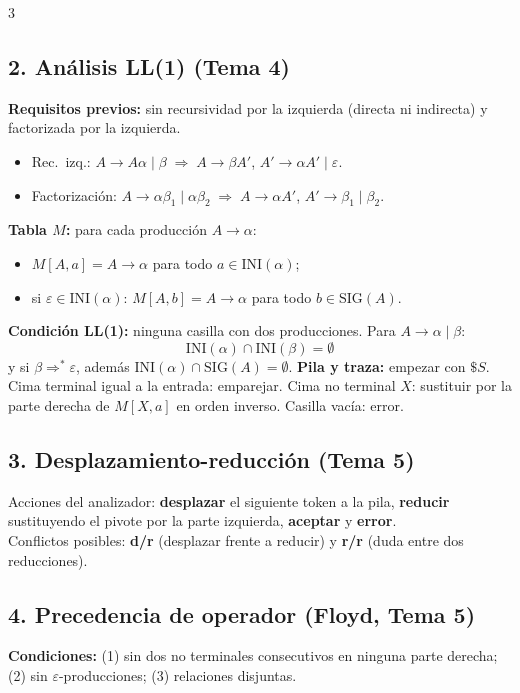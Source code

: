 \begin{landscape}
\begin{multicols*}{3}
\subsection*{2. Análisis LL(1) (Tema 4)}
\textbf{Requisitos previos:} sin recursividad por la izquierda (directa ni indirecta) y factorizada por la izquierda.
\begin{itemize}
\item Rec.\ izq.: $A\to A\alpha\mid\beta\;\Rightarrow\;A\to\beta A'$, $A'\to\alpha A'\mid\varepsilon$.
\item Factorización: $A\to\alpha\beta_1\mid\alpha\beta_2\;\Rightarrow\;A\to\alpha A'$, $A'\to\beta_1\mid\beta_2$.
\end{itemize}
\textbf{Tabla $M$:} para cada producción $A\to\alpha$:
\begin{itemize}
\item $M[A,a]=A\to\alpha$ para todo $a\in\mathrm{INI}(\alpha)$;
\item si $\varepsilon\in\mathrm{INI}(\alpha)$: $M[A,b]=A\to\alpha$ para todo $b\in\mathrm{SIG}(A)$.
\end{itemize}
\textbf{Condición LL(1):} ninguna casilla con dos producciones. Para $A\to\alpha\mid\beta$:
\[
\mathrm{INI}(\alpha)\cap\mathrm{INI}(\beta)=\emptyset
\]
y si $\beta\Rightarrow^*\varepsilon$, además $\mathrm{INI}(\alpha)\cap\mathrm{SIG}(A)=\emptyset$.
\textbf{Pila y traza:} empezar con $\$S$. Cima terminal igual a la entrada: emparejar. Cima no terminal $X$: sustituir por la parte derecha de $M[X,a]$ en orden inverso. Casilla vacía: error.

\subsection*{3. Desplazamiento-reducción (Tema 5)}
Acciones del analizador: \textbf{desplazar} el siguiente token a la pila, \textbf{reducir} sustituyendo el pivote por la parte izquierda, \textbf{aceptar} y \textbf{error}.\\
Conflictos posibles: \textbf{d/r} (desplazar frente a reducir) y \textbf{r/r} (duda entre dos reducciones).

\subsection*{4. Precedencia de operador (Floyd, Tema 5)}
\textbf{Condiciones:} (1) sin dos no terminales consecutivos en ninguna parte derecha; (2) sin $\varepsilon$-producciones; (3) relaciones disjuntas.


\end{multicols*}
\end{landscape}
